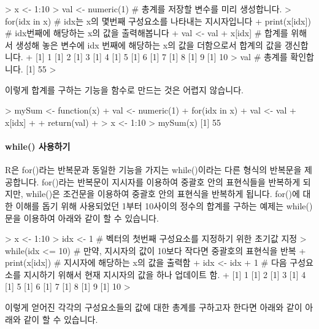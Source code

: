 \begin{Schunk}
\begin{Soutput}
> x <- 1:10
> val <- numeric(1)    # 총계를 저장할 변수를 미리 생성합니다.
> for(idx in x){       # idx는 x의 몇번째 구성요소를 나타내는 지시자입니다
+ print(x[idx])        # idx번째에 해당하는 x의 값을 출력해봅니다 
+ val <- val + x[idx]  # 합계를 위해서 생성해 놓은 변수에 idx 번째에 해당하는 x의 값을 더함으로서 합계의 값을 갱신합니다.
+ }
[1] 1
[1] 2
[1] 3
[1] 4
[1] 5
[1] 6
[1] 7
[1] 8
[1] 9
[1] 10
> val                   # 총계를 확인합니다. 
[1] 55
> 
\end{Soutput}
\end{Schunk}

이렇게 합계를 구하는 기능을 함수로 만드는 것은 어렵지 않습니다.

\begin{Schunk}
\begin{Soutput}
> mySum <- function(x){
+ val <- numeric(1)
+ for(idx in x){
+ val <- val + x[idx]
+ }
+ return(val)
+ }
> x <- 1:10
> mySum(x)
[1] 55
\end{Soutput}
\end{Schunk}

\paragraph{while() 사용하기}
R은 for()라는 반복문과 동일한 기능을 가지는 while()이라는 다른 형식의 반복문을 제공합니다.
for()라는 반복문이 지시자를 이용하여 중괄호 안의 표현식들을 반복하게 되지만, while()은 조건문을 이용하여 중괄호 안의 표현식을 반복하게 됩니다. 
for()에 대한 이해를 돕기 위해 사용되었던 1부터 10사이의 정수의 합계를 구하는 예제는 while()문을 이용하여 아래와 같이 할 수 있습니다.

\begin{Schunk}
\begin{Soutput}
> x <- 1:10
> idx <- 1              # 벡터의 첫번째 구성요소를 지정하기 위한 초기값 지정 
> while(idx <= 10){     # 만약, 지시자의 값이 10보다 작다면 중괄호의 표현식을 반복 
+ print(x[idx])         # 지시자에 해당하는 x의 값을 출력함 
+ idx <- idx + 1        # 다음 구성요소를 지시하기 위해서 현재 지시자의 값을 하나 업데이트 함.
+ }
[1] 1
[1] 2
[1] 3
[1] 4
[1] 5
[1] 6
[1] 7
[1] 8
[1] 9
[1] 10
> 
\end{Soutput}
\end{Schunk}

이렇게 얻어진 각각의 구성요소들의 값에 대한 총계를 구하고자 한다면 아래와 같이 아래와 같이 할 수 있습니다.

